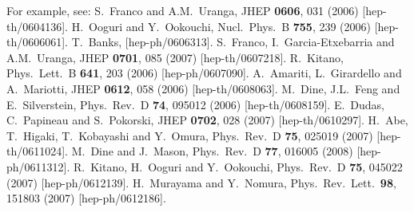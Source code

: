 \documentclass[11pt]{article}
\begin{document}
\begin{thebibliography}{999}
For example, see:
  S.~Franco and A.M.~Uranga,
  JHEP {\bf 0606}, 031 (2006)
  [hep-th/0604136].
%
  H.~Ooguri and Y.~Ookouchi, 
  Nucl.\ Phys.\  B {\bf 755}, 239 (2006)
  [hep-th/0606061].
%  
  T.~Banks,
  [hep-ph/0606313].
%  
  S.~Franco, I.~Garcia-Etxebarria and A.M.~Uranga,
  JHEP {\bf 0701}, 085 (2007)
  [hep-th/0607218].
%
  R.~Kitano,
  Phys.\ Lett.\  B {\bf 641}, 203 (2006)
  [hep-ph/0607090].
%  
  A.~Amariti, L.~Girardello and A.~Mariotti,
  JHEP {\bf 0612}, 058 (2006)
  [hep-th/0608063].
%
  M.~Dine, J.L.~Feng and E.~Silverstein,
  Phys.\ Rev.\  D {\bf 74}, 095012 (2006)
  [hep-th/0608159].
%
  E.~Dudas, C.~Papineau and S.~Pokorski,
  JHEP {\bf 0702}, 028 (2007)
  [hep-th/0610297].
%
  H.~Abe, T.~Higaki, T.~Kobayashi and Y.~Omura,
  Phys.\ Rev.\  D {\bf 75}, 025019 (2007)
  [hep-th/0611024].
%  
  M.~Dine and J.~Mason,
  Phys.\ Rev.\  D {\bf 77}, 016005 (2008)
  [hep-ph/0611312].
%  
  R.~Kitano, H.~Ooguri and Y.~Ookouchi,
  Phys.\ Rev.\  D {\bf 75}, 045022 (2007)
  [hep-ph/0612139].
%  
  H.~Murayama and Y.~Nomura,
  Phys.\ Rev.\ Lett.\  {\bf 98}, 151803 (2007)
  [hep-ph/0612186].

\end{thebibliography}
\end{document}
